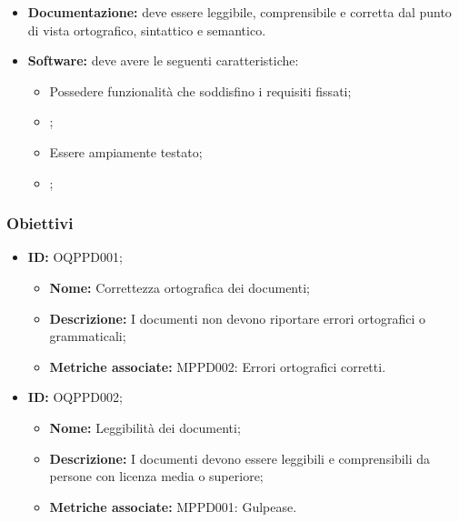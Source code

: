 \documentclass[openany,12pt,a4paper]{report}
\begin{document}
    \begin{itemize}
        \item \textbf{Documentazione:} deve essere leggibile, comprensibile e corretta dal punto di vista ortografico, sintattico e semantico.
        
        \item \textbf{Software:} deve avere le seguenti caratteristiche:
        \begin{itemize}
            \item Possedere funzionalità che soddisfino i requisiti fissati;
            \item {};
            \item Essere ampiamente testato;
            \item {};
        \end{itemize}
    \end{itemize}
    
    \subsubsection{Obiettivi}
        
        \begin{itemize}
            \item \textbf{ID:} OQPPD001;
            \begin{itemize}            	
            	\item \textbf{Nome:} Correttezza ortografica dei documenti;
            	\item \textbf{Descrizione:} I documenti non devono riportare errori ortografici o grammaticali;
            	\item \textbf{Metriche associate:} MPPD002: Errori ortografici corretti.
        	\end{itemize}
        \end{itemize} 
        
        \begin{itemize}
            \item \textbf{ID:} OQPPD002;
            \begin{itemize} 
            	\item \textbf{Nome:} Leggibilità dei documenti;
            	\item \textbf{Descrizione:} I documenti devono essere leggibili e comprensibili da persone con licenza media o superiore;
            	\item \textbf{Metriche associate:} MPPD001: Gulpease.
            \end{itemize}
        \end{itemize} 
        
\end{document}
